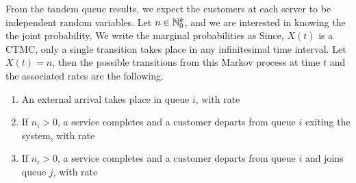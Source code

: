 \documentclass[a4paper,10pt,english]{article}
\begin{document}
From the tandem queue results, we expect the customers at each server to be independent random variables. 
Let $n \in \mathbb{N}_0^k$, and we are interested in knowing the the joint probability,
We write the marginal probabilities as 
Since, $X(t)$ is a CTMC, only a single transition takes place in any infinitesimal time interval. 
Let $X(t) = n$, then the possible transitions from this Markov process at time $t$ and the associated rates are the following.  
\begin{enumerate}[i\_]
\item An external arrival takes place in queue $i$, with rate 
\item If $n_i > 0$, a service completes and a customer departs from queue $i$ exiting the system, with rate 
\item If $n_i > 0$, a service completes and a customer departs from queue $i$ and joins queue $j$, with rate 
\end{enumerate}
\end{document}

